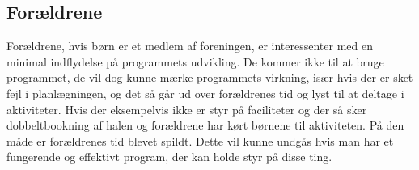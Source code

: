 
\subsection{Forældrene}
Forældrene, hvis børn er et medlem af foreningen, er interessenter med en minimal indflydelse på programmets udvikling. De kommer ikke til at bruge programmet, de vil dog kunne mærke programmets virkning, især hvis der er sket fejl i planlægningen, og det så går ud over forældrenes tid og lyst til at deltage i aktiviteter. Hvis der eksempelvis ikke er styr på faciliteter og der så sker dobbeltbookning af halen og forældrene har kørt børnene til aktiviteten. På den måde er forældrenes tid blevet spildt. Dette vil kunne undgås hvis man har et fungerende og effektivt program, der kan holde styr på disse ting.


